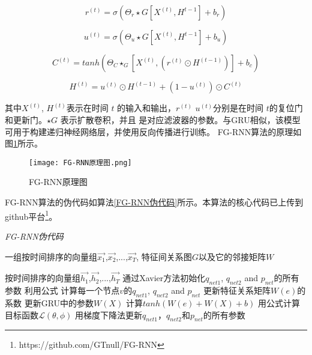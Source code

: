 \begin{equation}
    r^{(t)} = \sigma(\Theta_r\star G[X^{(t)},H^{t-1}] + b_r)
\end{equation}

\begin{equation}
    u^{(t)} = \sigma(\Theta_u\star G[X^{(t)},H^{t-1}] + b_u)
\end{equation}

\begin{equation}
    C^{(t)} = tanh(\Theta_C\star_G[X^{(t)},(r^{(t)}\odot H^{(t-1)})] + b_c)
\end{equation}

\begin{equation}
    H^{(t)} = u^{(t)}\odot H^{(t-1)} + (1 - u^{(t)}) \odot C^{(t)}
\end{equation}

其中$X^{(t)}$, $H^{(t)}$表示在时间 $t$ 的输入和输出，$r^{(t)}$ $u^{(t)}$分别是在时间 $t$的复位门和更新门。$\star G$  表示扩散卷积，并且  是对应滤波器的参数。与GRU相似，该模型可用于构建递归神经网络层，并使用反向传播进行训练。
FG-RNN算法的原理如图\ref{fig:FG-RNN原理图}所示。
\begin{figure}[H]
  \centering
  \texttt{[image: FG-RNN原理图.png]}
  \caption{FG-RNN原理图}
  \label{fig:FG-RNN原理图}
\end{figure}
FG-RNN算法的伪代码如算法\ref{FG-RNN伪代码}所示。本算法的核心代码已上传到github平台\footnote{https://github.com/GTnull/FG-RNN}。
\begin{algorithm}[!h]
  \caption{\emph{FG-RNN伪代码}}
  \label{FG-RNN伪代码}
  \begin{algorithmic}[1]
    \Require
      一组按时间排序的向量组$\vec{x_1}$,$\vec{x_2}$,...,$\vec{x_T}$, 特征间关系图$G$以及它的邻接矩阵$W$

    \Ensure
      按时间排序的向量组$\vec{h_1}$,$\vec{h_2}$,...,$\vec{h_T}$
    \State 通过Xavier方法初始化$q_{net1}$, $q_{net2}$ and $p_{net}$的所有参数
        \State 利用公式 计算每一个节点$v$的$q_{net1}$, $q_{net2}$ and $p_{net}$
        \State 更新特征关系矩阵$W(e)$的系数
        \State 更新GRU中的参数$W(X)$
        \State 计算$tanh(W(e) + W(X) + b)$        
        \EndFor
        \State 用公式计算目标函数$\mathcal{L}(\theta, \phi)$ 
        \State 用梯度下降法更新$q_{net1}$，$q_{net2}$和$p_{net}$的所有参数
    \EndWhile
  \end{algorithmic}
\end{algorithm}

